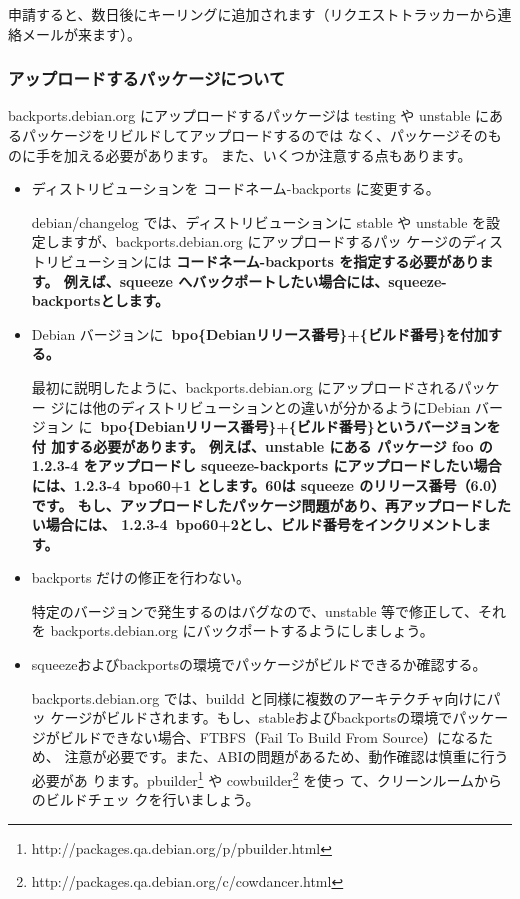 \documentclass[mingoth,a4paper]{jsarticle}
\begin{document}
申請すると、数日後にキーリングに追加されます（リクエストトラッカーから連
絡メールが来ます）。

\subsubsection{アップロードするパッケージについて}

backports.debian.org にアップロードするパッケージは
 testing や unstable にあるパッケージをリビルドしてアップロードするのでは
なく、パッケージそのものに手を加える必要があります。
また、いくつか注意する点もあります。

\begin{itemize}

\item ディストリビューションを コードネーム-backports に変更する。


debian/changelog では、ディストリビューションに stable 
や unstable を設定しますが、backports.debian.org にアップロードするパッ
ケージのディストリビューションには \bf{コードネーム-backports} を指定する必要があります。
例えば、squeeze へバックポートしたい場合には、\bf{squeeze-backports}とします。


\item Debian バージョンに\bf{~{}bpo\{Debianリリース番号\}+\{ビルド番号\}}を付加する。

最初に説明したように、backports.debian.org にアップロードされるパッケー
ジには他のディストリビューションとの違いが分かるようにDebian バージョン
に\bf{~{}bpo\{Debianリリース番号\}+\{ビルド番号\}}というバージョンを付
加する必要があります。
例えば、unstable にある パッケージ foo の \bf{1.2.3-4} をアップロードし
squeeze-backports にアップロードしたい場合には、\bf{1.2.3-4~{}bpo60+1}
とします。60は squeeze のリリース番号（6.0）です。
もし、アップロードしたパッケージ問題があり、再アップロードしたい場合には、
\bf{1.2.3-4~{}bpo60+2}とし、ビルド番号をインクリメントします。



\item backports だけの修正を行わない。

特定のバージョンで発生するのはバグなので、unstable 等で修正して、それを
backports.debian.org にバックポートするようにしましょう。

\item squeezeおよびbackportsの環境でパッケージがビルドできるか確認する。

backports.debian.org では、buildd と同様に複数のアーキテクチャ向けにパッ
ケージがビルドされます。もし、stableおよびbackportsの環境でパッケー
ジがビルドできない場合、FTBFS（Fail To Build From Source）になるため、
注意が必要です。また、ABIの問題があるため、動作確認は慎重に行う必要があ
ります。pbuilder\footnote{http://packages.qa.debian.org/p/pbuilder.html}
や 
cowbuilder\footnote{http://packages.qa.debian.org/c/cowdancer.html} を使っ
て、クリーンルームからのビルドチェッ
クを行いましょう。


\end{itemize}
\end{document}

